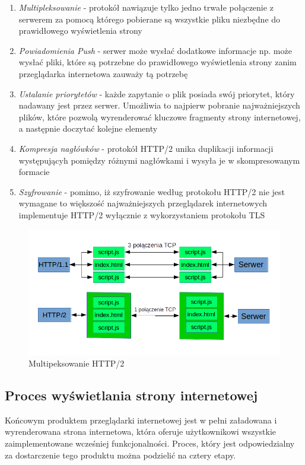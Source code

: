 \documentclass[polish, twoside, 12pt]{mwart}
\begin{document}
\begin{enumerate}
  \item \emph{Multipleksowanie} - protokół nawiązuje tylko jedno trwałe połączenie z serwerem za pomocą którego pobierane są wszystkie pliku niezbędne do prawidłowego wyświetlenia strony
  \item \emph{Powiadomienia Push} - serwer może wysłać dodatkowe informacje np. może wysłać pliki, które są potrzebne do prawidłowego wyświetlenia strony zanim przeglądarka internetowa zauważy tą potrzebę
  \item \emph{Ustalanie priorytetów} - każde zapytanie o plik posiada swój priorytet, który nadawany jest przez serwer. Umożliwia to najpierw pobranie najważniejszych plików, które pozwolą wyrenderować kluczowe fragmenty strony internetowej, a następnie doczytać kolejne elementy
  \item \emph{Kompresja nagłówków} - protokół HTTP/2 unika duplikacji informacji występującyh pomiędzy różnymi nagłówkami i wysyła je w skompresowanym formacie
  \item \emph{Szyfrowanie} - pomimo, iż szyfrowanie według protokołu HTTP/2 nie jest wymagane to większość najważniejszych przeglądarek internetowych implementuje HTTP/2 wyłącznie z wykorzystaniem protokołu TLS
\end{enumerate}

\begin{figure}[ht]
  \includegraphics[width=\textwidth]{http2-mux.png}
	\caption{Multipeksowanie HTTP/2}
\end{figure}

\subsection{Proces wyświetlania strony internetowej}

Końcowym produktem przeglądarki internetowej jest w pełni załadowana i wyrenderowana strona internetowa, która oferuje użytkownikowi wszystkie zaimplementowane wcześniej funkcjonalności. Proces, który jest odpowiedzialny za dostarczenie tego produktu można podzielić na cztery etapy.
\end{document}
